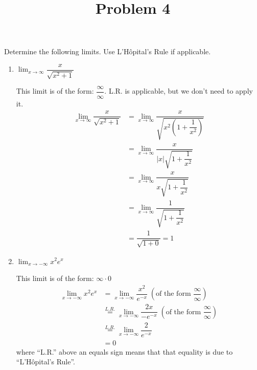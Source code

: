 \documentclass{ximera}
\title[Problem 4]{Problem 4}
\begin{document}
\begin{abstract} \end{abstract}
\maketitle


\begin{problem}
  Determine the following limits.
  Use L'H\^{o}pital's Rule if applicable.
  \begin{enumerate}
  
  \item  $\displaystyle \lim_{x \to \infty} \dfrac{x}{\sqrt{x^2 + 1}}  $

    \begin{explanation}
    
    This limit is of the form:  $\dfrac{\infty}{\infty}$. L.R. is applicable, but we don't need to apply it.
      \begin{align*}
        \displaystyle \lim_{x \to \infty} \dfrac{x}{\sqrt{x^2 + 1}} &= \displaystyle \lim_{x \to \infty} \dfrac{x}{\sqrt{x^2 \left(1 + \dfrac{1}{x^2} \right)}} \\
                                                     &=  \displaystyle \lim_{x \to \infty} \dfrac{x}{|x| \sqrt{1 + \dfrac{1}{x^2} }} \\
                                                     &=  \displaystyle \lim_{x \to \infty} \dfrac{x}{x \sqrt{1 + \dfrac{1}{x^2} }} \\
                                                     &=  \displaystyle \lim_{x \to \infty} \dfrac{1}{\sqrt{1 + \dfrac{1}{x^2} }} \\
                                                     &= \dfrac{1}{\sqrt{1 + 0}} = 1
      \end{align*}
    \end{explanation}
    
    
  \item  $\displaystyle \lim_{x \to - \infty} x^2 e^x $
    \begin{explanation}
    This limit is of the form: $\infty \cdot 0$
      \begin{align*}
        \displaystyle \lim_{x \to - \infty} x^2 e^x &= \displaystyle \lim_{x \to - \infty} \dfrac{x^2}{ e^{-x}} \; \left( \text{of the form } \dfrac{\infty}{\infty} \right) \\
                                      &\stackrel{L.R.}{=}  \displaystyle \lim_{x \to - \infty} \dfrac{2x}{- e^{-x}} \; \left( \text{of the form } \dfrac{\infty}{\infty} \right) \\
                                      &\stackrel{L.R.}{=}  \displaystyle \lim_{x \to - \infty} \dfrac{2}{ e^{-x}}  \\
                                      &= 0
      \end{align*}
      where ``L.R.'' above an equals sign means that that equality is due to ``L'H\^{o}pital's Rule''.  
    \end{explanation}
    

\end{enumerate}
\end{problem}
\end{document}
